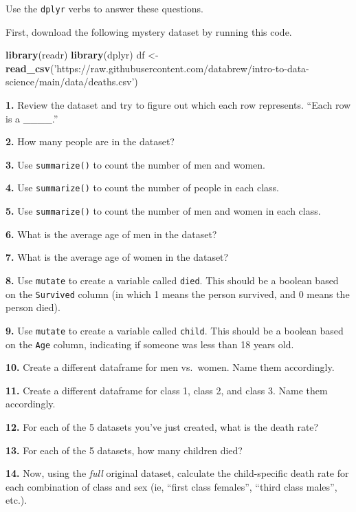 \documentclass[]{book}
\newenvironment{Shaded}{\begin{snugshade}}{\end{snugshade}}
\newcommand{\KeywordTok}[1]{\textcolor[rgb]{0.13,0.29,0.53}{\textbf{#1}}}
\newcommand{\NormalTok}[1]{#1}
\newcommand{\StringTok}[1]{\textcolor[rgb]{0.31,0.60,0.02}{#1}}
\begin{document}
Use the \texttt{dplyr} verbs to answer these questions.

First, download the following mystery dataset by running this code.

\begin{Shaded}
\begin{Highlighting}[]
\KeywordTok{library}\NormalTok{(readr)}
\KeywordTok{library}\NormalTok{(dplyr)}
\NormalTok{df <-}\StringTok{ }\KeywordTok{read_csv}\NormalTok{(}\StringTok{'https://raw.githubusercontent.com/databrew/intro-to-data-science/main/data/deaths.csv'}\NormalTok{)}
\end{Highlighting}
\end{Shaded}

\textbf{1.} Review the dataset and try to figure out which each row represents. ``Each row is a \_\_\_\_.''

\textbf{2.} How many people are in the dataset?

\textbf{3.} Use \texttt{summarize()} to count the number of men and women.

\textbf{4.} Use \texttt{summarize()} to count the number of people in each class.

\textbf{5.} Use \texttt{summarize()} to count the number of men and women in each class.

\textbf{6.} What is the average age of men in the dataset?

\textbf{7.} What is the average age of women in the dataset?

\textbf{8.} Use \texttt{mutate} to create a variable called \texttt{died}. This should be a boolean based on the \texttt{Survived} column (in which 1 means the person survived, and 0 means the person died).

\textbf{9.} Use \texttt{mutate} to create a variable called \texttt{child}. This should be a boolean based on the \texttt{Age} column, indicating if someone was less than 18 years old.

\textbf{10.} Create a different dataframe for men vs.~women. Name them accordingly.

\textbf{11.} Create a different dataframe for class 1, class 2, and class 3. Name them accordingly.

\textbf{12.} For each of the 5 datasets you've just created, what is the death rate?

\textbf{13.} For each of the 5 datasets, how many children died?

\textbf{14.} Now, using the \emph{full} original dataset, calculate the child-specific death rate for each combination of class and sex (ie, ``first class females'', ``third class males'', etc.).
\end{document}
